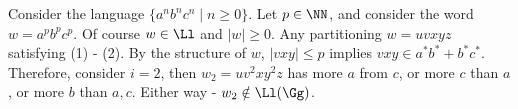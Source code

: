 \begin{example}
	Consider the language $\{a^nb^nc^n\mid n\geq 0\}$. Let $p\in \NN$, and consider the word $w = a^pb^pc^p$. Of course $w\in \Ll$ and $|w| \geq 0$. Any partitioning $w = uvxyz$ satisfying (1) - (2). By the structure of $w$, $|vxy|\leq p$ implies $vxy\in a^*b^* + b^*c^*$. Therefore, consider $i=2$, then
	$w_2 = uv^2xy^2z$ has more $a$ from $c$, or more $c$ than $a$, or more $b$ than $a,c$. Either way - $w_2\notin \Ll(\Gg)$.
\end{example}


